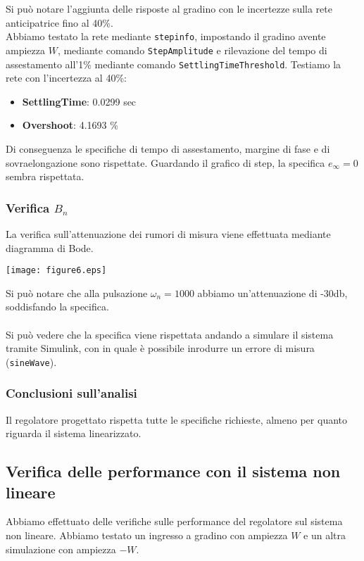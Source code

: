 \documentclass{article}
\begin{document}
Si può notare l'aggiunta delle risposte al gradino con le incertezze sulla rete anticipatrice fino al 40\%.\\

Abbiamo testato la rete mediante \texttt{stepinfo}, impostando il gradino avente ampiezza $W$, mediante comando \texttt{StepAmplitude} e rilevazione del tempo di assestamento all'1\% mediante comando \texttt{SettlingTimeThreshold}. Testiamo la rete con l'incertezza al 40\%:

\begin{itemize}
    \item \textbf{SettlingTime}: 0.0299 sec
    \item \textbf{Overshoot}: 4.1693 \%
\end{itemize}

Di conseguenza le specifiche di tempo di assestamento, margine di fase e di sovraelongazione sono rispettate. Guardando il grafico di step, la specifica $e_\infty=0$ sembra rispettata. 

\subsubsection{Verifica $B_n$}

La verifica sull'attenuazione dei rumori di misura viene effettuata mediante diagramma di Bode.

\begin{center}
    \texttt{[image: figure6.eps]}
\end{center}

Si può notare che alla pulsazione $\omega_n=1000$ abbiamo un'attenuazione di -30db, soddisfando la specifica.\\\\

Si può vedere che la specifica viene rispettata andando a simulare il sistema tramite Simulink, con in quale è possibile inrodurre un errore di misura (\texttt{sineWave}).

\subsubsection{Conclusioni sull'analisi}

Il regolatore progettato rispetta tutte le specifiche richieste, almeno per quanto riguarda il sistema linearizzato.

\newpage

\subsection{Verifica delle performance con il sistema non lineare}
Abbiamo effettuato delle verifiche sulle performance del regolatore sul sistema non lineare. Abbiamo testato un ingresso a gradino con ampiezza $W$ e un altra simulazione con ampiezza $-W$.
\end{document}
